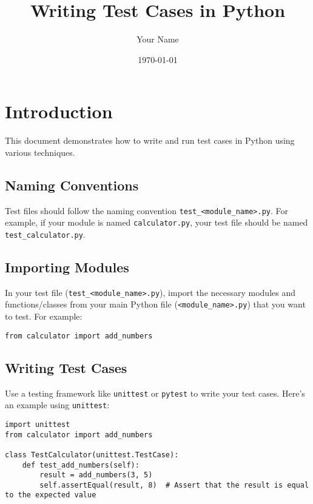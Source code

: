 \documentclass{article}
\begin{document}
\title{Writing Test Cases in Python}
\author{Your Name}
\date{\today}
\maketitle

\section{Introduction}

This document demonstrates how to write and run test cases in Python using various techniques.

\subsection{Naming Conventions}

Test files should follow the naming convention \texttt{test\_<module\_name>.py}. For example, if your module is named \texttt{calculator.py}, your test file should be named \texttt{test\_calculator.py}.

\subsection{Importing Modules}

In your test file (\texttt{test\_<module\_name>.py}), import the necessary modules and functions/classes from your main Python file (\texttt{<module\_name>.py}) that you want to test. For example:

\begin{lstlisting}[style=python]
from calculator import add_numbers
\end{lstlisting}

\subsection{Writing Test Cases}

Use a testing framework like \texttt{unittest} or \texttt{pytest} to write your test cases. Here's an example using \texttt{unittest}:

\begin{lstlisting}[style=python]
import unittest
from calculator import add_numbers

class TestCalculator(unittest.TestCase):
    def test_add_numbers(self):
        result = add_numbers(3, 5)
        self.assertEqual(result, 8)  # Assert that the result is equal to the expected value
\end{lstlisting}
\end{document}
